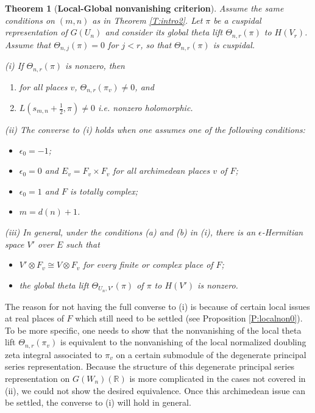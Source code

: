 \documentclass[10pt]{amsart}
\theoremstyle{plain}
\newtheorem{Thm}[equation]{Theorem}
\numberwithin{equation}{section}
\begin{document}
\begin{Thm}[{\bf Local-Global nonvanishing criterion}]\label{T:intro3}
 Assume the same conditions on $(m, n)$ as in Theorem \ref{T:intro2}. 
Let $\pi$ be  a cuspidal representation of $G(U_n)$ and consider its
global theta lift $\Theta_{n,r}(\pi)$ to $H(V_r)$. Assume that
$\Theta_{n,j}(\pi) = 0$ for $j < r$, so that  $\Theta_{n,r}(\pi)$   
 is cuspidal.  
 \vskip 5pt
 
 \noindent (i)  If $\Theta_{n,r}(\pi)$ is nonzero, then
 \begin{enumerate}
\item[(a)] for all places $v$, $\Theta_{n,r}(\pi_v) \ne 0$, and
\item[(b)] $L(s_{m,n} + \frac{1}{2}, \pi)\ne  0$ i.e. nonzero holomorphic.  
\end{enumerate}
\vskip 10pt

\noindent (ii) The converse to (i) holds when one assumes one of the following conditions:
 \begin{itemize}
 \item  $\epsilon_0 = -1$;
 \item  $\epsilon_0 = 0$  and $E_v = F_v \times F_v$ for all archimedean places $v$ of $F$;
 \item  $\epsilon_0 = 1$ and $F$ is totally complex;
 \item $m = d(n)+1$.
 \end{itemize}
 
 \vskip 5pt
 
 \noindent (iii) In general, under the conditions (a) and (b) in (i),
 there is an $\epsilon$-Hermitian space $V'$ over $E$ such that 
 \begin{itemize}
 \item  $V' \otimes F_v \cong V \otimes F_v$  for every finite or complex place of $F$;
 \item  the global theta lift $\Theta_{U_n, V'}(\pi)$ of $\pi$ to $H(V')$ is nonzero.  
 \end{itemize}
 \end{Thm}
\vskip 10pt

The reason for not having the full converse to (i) is because of 
certain local issues at real places of $F$ which still need to be settled (see Proposition
\ref{P:localnon0}).  To be more specific, one needs to show that the
nonvanishing of the local theta lift  $\Theta_{n,r}(\pi_v)$ is
equivalent to the nonvanishing of the local normalized doubling zeta
integral associated to $\pi_v$ on a certain submodule of the
degenerate principal series representation.  Because the  structure of this  degenerate
principal series representation on
$G(W_n)({\mathbb{R}})$ is more complicated in the cases not covered in (ii),  we
could not show the desired equivalence. Once this archimedean issue
can be settled, the converse to (i) will hold in general.
\vskip 5pt
\end{document}
